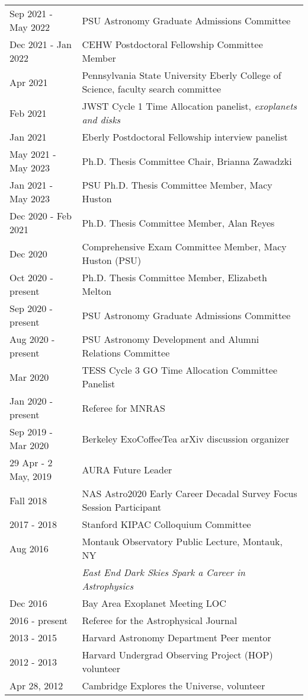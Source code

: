 \begin{tabular*}{\textwidth}{@{\hspace{10pt}}p{1.4in}l}
Sep 2021 - May 2022 & PSU Astronomy Graduate Admissions Committee \\ 
Dec 2021 - Jan 2022 & CEHW Postdoctoral Fellowship Committee Member \\
Apr 2021 & Pennsylvania State University Eberly College of Science, faculty search committee\\
Feb 2021 & JWST Cycle 1 Time Allocation panelist, \emph{exoplanets and disks}\\
Jan 2021 & Eberly Postdoctoral Fellowship interview panelist\\
May 2021 - May 2023 & Ph.D. Thesis Committee Chair, Brianna Zawadzki\\
Jan 2021 - May 2023 & PSU Ph.D. Thesis Committee Member, Macy Huston\\
Dec 2020 - Feb 2021 & Ph.D. Thesis Committee Member, Alan Reyes\\
Dec 2020 & Comprehensive Exam Committee Member, Macy Huston (PSU)\\
Oct 2020 - present & Ph.D. Thesis Committee Member, Elizabeth Melton\\
Sep 2020 - present & PSU Astronomy Graduate Admissions Committee \\ 
Aug 2020 - present & PSU Astronomy Development and Alumni Relations Committee \\
Mar 2020 & TESS Cycle 3 GO Time Allocation Committee Panelist \\
Jan 2020 - present & Referee for MNRAS \\ 
Sep 2019 - Mar 2020 & Berkeley ExoCoffeeTea arXiv discussion organizer \\ 
29 Apr - 2 May, 2019 & AURA Future Leader \\
Fall 2018 & NAS Astro2020 Early Career Decadal Survey Focus Session Participant \\
2017 - 2018 & Stanford KIPAC Colloquium Committee \\
Aug 2016 & Montauk Observatory Public Lecture, Montauk, NY \\
&  \emph{East End Dark Skies Spark a Career in Astrophysics}\\
Dec 2016 & Bay Area Exoplanet Meeting LOC \\
2016 - present & Referee for the Astrophysical Journal \\
2013 - 2015 & Harvard Astronomy Department Peer mentor\\
2012 - 2013 & Harvard Undergrad Observing Project (HOP) volunteer\\
Apr 28, 2012 & Cambridge Explores the Universe, volunteer\\

\end{tabular*}
